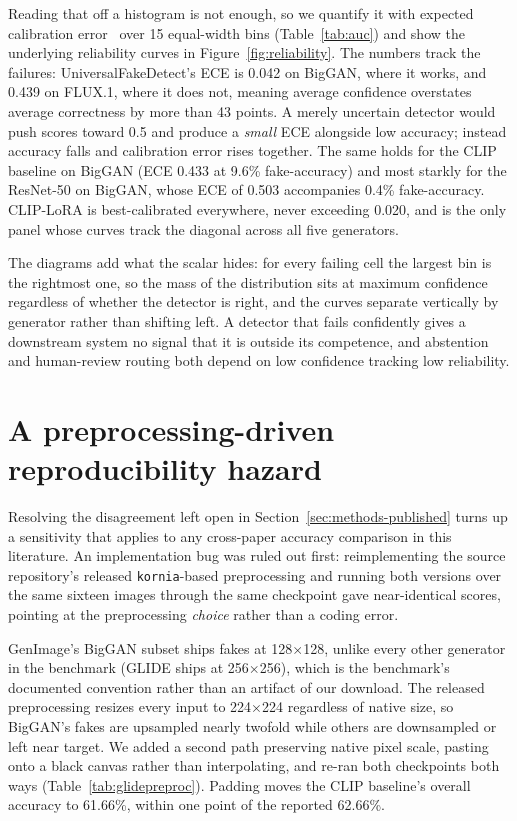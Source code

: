 \documentclass[3p,times,procedia]{elsarticle}
\begin{document}
Reading that off a histogram is not enough, so we quantify it with
expected calibration error~\cite{guo2017calibration} over 15 equal-width
bins (Table~\ref{tab:auc}) and show the underlying reliability curves in
Figure~\ref{fig:reliability}. The numbers track the failures:
UniversalFakeDetect's ECE is 0.042 on BigGAN, where it works, and 0.439 on
FLUX.1, where it does not, meaning average confidence overstates average
correctness by more than 43 points. A merely uncertain detector would push
scores toward 0.5 and produce a \emph{small} ECE alongside low accuracy;
instead accuracy falls and calibration error rises together. The same
holds for the CLIP baseline on BigGAN (ECE 0.433 at 9.6\% fake-accuracy)
and most starkly for the ResNet-50 on BigGAN, whose ECE of 0.503
accompanies 0.4\% fake-accuracy. CLIP-LoRA is best-calibrated everywhere,
never exceeding 0.020, and is the only panel whose curves track the
diagonal across all five generators.

The diagrams add what the scalar hides: for every failing cell the largest
bin is the rightmost one, so the mass of the distribution sits at maximum
confidence regardless of whether the detector is right, and the curves
separate vertically by generator rather than shifting left. A detector
that fails confidently gives a downstream system no signal that it is
outside its competence, and abstention and human-review routing both
depend on low confidence tracking low reliability.

\section{A preprocessing-driven reproducibility hazard}
\label{sec:discussion}

Resolving the disagreement left open in Section~\ref{sec:methods-published}
turns up a sensitivity that applies to any cross-paper accuracy comparison
in this literature. An implementation bug was ruled out first:
reimplementing the source repository's released \texttt{kornia}-based
preprocessing and running both versions over the same sixteen images
through the same checkpoint gave near-identical scores, pointing at the
preprocessing \emph{choice} rather than a coding error.

GenImage's BigGAN subset ships fakes at 128$\times$128, unlike every other
generator in the benchmark (GLIDE ships at 256$\times$256), which is the
benchmark's documented convention rather than an artifact of our download.
The released preprocessing resizes every input to 224$\times$224
regardless of native size, so BigGAN's fakes are upsampled nearly twofold
while others are downsampled or left near target. We added a second path
preserving native pixel scale, pasting onto a black canvas rather than
interpolating, and re-ran both checkpoints both ways
(Table~\ref{tab:glidepreproc}). Padding moves the CLIP baseline's overall
accuracy to 61.66\%, within one point of the reported 62.66\%.
\end{document}
